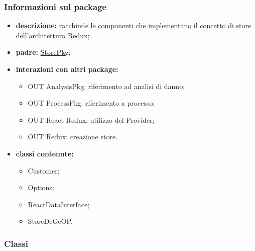 \subsubsection{Informazioni sul package}
\begin{itemize}
	\item \textbf{descrizione:} racchiude le componenti che implementano il concetto di store dell'architettura Redux;
	\item \textbf{padre:} \hyperref[pkg::StorePkg]{StorePkg};
	\item \textbf{interazioni con altri package:} 
	\begin{itemize}
		\item OUT AnalysisPkg: riferimento ad analisi di danno;
		\item OUT ProcessPkg: riferimento a processo;
		\item OUT React-Redux: utilizzo del Provider;
		\item OUT Redux: creazione store.
	\end{itemize}
	\item \textbf{classi contenute:}
	\begin{itemize}
		\item Customer;
		\item Options;
		\item ReactDataInterface;
		\item StoreDeGeOP.
	\end{itemize}
\end{itemize}
\subsubsection{Classi}
